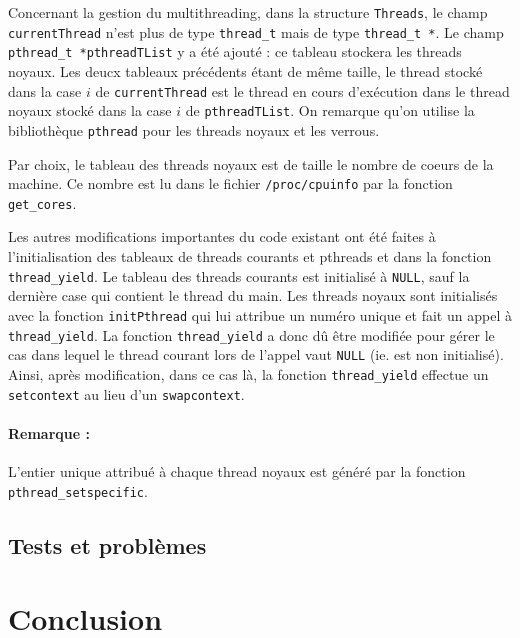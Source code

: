 \documentclass[a4paper,11pt]{article}
\begin{document}
Concernant la gestion du multithreading, dans la structure \texttt{Threads}, le champ \texttt{currentThread} n'est plus de type \texttt{thread\_t} mais de type \texttt{thread\_t *}. Le champ \texttt{pthread\_t *pthreadTList} y a été ajouté : ce tableau stockera les threads noyaux. Les deucx tableaux précédents étant de même taille, le thread stocké dans la case $i$ de \texttt{currentThread} est le thread en cours d'exécution dans le thread noyaux stocké dans la case $i$ de \texttt{pthreadTList}. On remarque qu'on utilise la bibliothèque \texttt{pthread} pour les threads noyaux et les verrous.

Par choix, le tableau des threads noyaux est de taille le nombre de coeurs de la machine. Ce nombre est lu dans le fichier \texttt{/proc/cpuinfo} par la fonction \texttt{get\_cores}.

Les autres modifications importantes du code existant ont été faites à l'initialisation des tableaux de threads courants et pthreads et dans la fonction \texttt{thread\_yield}. Le tableau des threads courants est initialisé à \texttt{NULL}, sauf la dernière case qui contient le thread du main. Les threads noyaux sont initialisés avec la fonction \texttt{initPthread} qui lui attribue un numéro unique et fait un appel à \texttt{thread\_yield}. La fonction \texttt{thread\_yield} a donc dû être modifiée pour gérer le cas dans lequel le thread courant lors de l'appel vaut \texttt{NULL} (ie. est non initialisé). Ainsi, après modification, dans ce cas là, la fonction \texttt{thread\_yield} effectue un \texttt{setcontext} au lieu d'un \texttt{swapcontext}.

\paragraph{Remarque : }

L'entier unique attribué à chaque thread noyaux est généré par la fonction \texttt{pthread\_setspecific}.

\subsection{Tests et problèmes}


\section*{Conclusion} %
\end{document}
